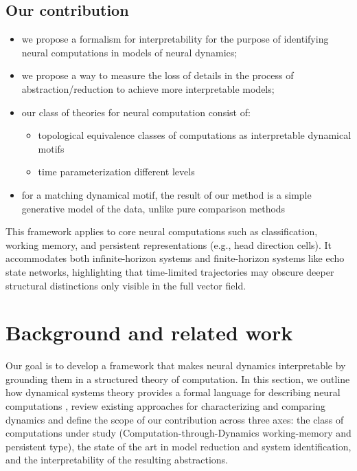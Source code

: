 \documentclass{article}
\theoremstyle{definition} \newtheorem{definition}{Definition}  \newtheorem{example}{Example}
\theoremstyle{remark} \newtheorem{remark}{Remark}
\newcounter{ct}
\begin{document}
\subsection{Our contribution}\label{sec:contribution}
\begin{itemize}
\item we propose a formalism for interpretability for the purpose of identifying neural computations in models of neural dynamics;
\item we propose a way to measure the loss of details in the process of abstraction/reduction to achieve more interpretable models;
\item our class of theories for neural computation consist of:
	\begin{itemize}
\item topological equivalence classes of computations as interpretable dynamical motifs
\item time parameterization different levels
\end{itemize}
\item for a matching dynamical motif, the result of our method is a simple generative model of the data, unlike pure comparison methods
\end{itemize}

This framework applies to core neural computations such as classification, working memory, and persistent representations (e.g., head direction cells).
 It accommodates both infinite-horizon systems and finite-horizon systems like echo state networks, highlighting that time-limited trajectories may obscure deeper structural distinctions only visible in the full vector field.

\section{Background and related work}\label{sec:background}
Our goal is to develop a framework that makes neural dynamics interpretable by grounding them in a structured theory of computation.
In this section, we outline how dynamical systems theory provides a formal language for describing neural computations \citep{jaeger2021theory, jaeger2023timescales, elgazzar2024universal}, review existing approaches for characterizing and comparing dynamics %
and define the scope of our contribution across three axes: the class of computations under study (Computation-through-Dynamics working-memory and persistent type), the state of the art in model reduction and system identification, and the interpretability of the resulting abstractions.
\end{document}
